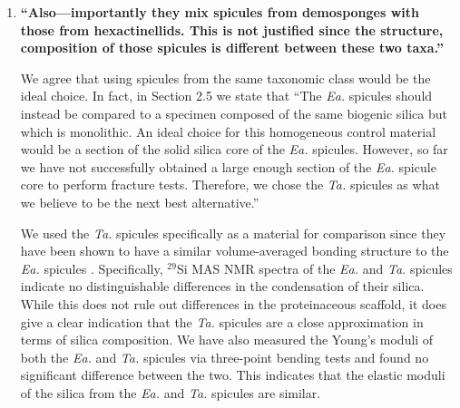 \documentclass[11pt,letterpaper]{report}
\makeatletter
\newcommand{\TA}{\textit{Ta.\@}\xspace}
\newcommand{\EA}{\textit{Ea.\@}\xspace}
\makeatother
\begin{document}
\begin{enumerate}[label=\textit{3.\arabic*},wide, labelwidth=!, labelindent=0pt]
To our knowledge Professor Weiner's group has not published any works on siliceous spicules (i.e. Demosponge or Hexactinellid spicules). Consequently, we have not included a review of their works in this manuscript. However, we do not deny the importance of the protein scaffold within the spicule's silica nor the composition of the interlayers. Our review of this topic focuses on the contributions of Dr. Weaver and Professor Aizenberg which are listed as references 17, 18, 43, and 54 in the revised version of the manuscript. These works describe the composition and nanoscale structure of the spicules' silica. We revisit the importance of the protein scaffold and composition of the silica itself in the final paragraph of Section 2.5. In this paragraph we point out that we chose the \TA spicules as a homogeneous control material based on the similarity of their composition and the composition of the \EA spicules. We admit that the best choice for this homogeneous control material would be the core of the \EA spicules themselves. However, we point out the difficulty of obtaining core samples large enough to test.

\item \label{r3c2} {\bf ``Also---importantly they mix spicules from demosponges with those from hexactinellids. This is not justified since the structure, composition of those spicules is different between these two taxa.''}

We agree that using spicules from the same taxonomic class would be the ideal choice. In fact, in Section 2.5 we state that ``The \EA spicules should instead be compared to a specimen composed of the same biogenic silica but which is monolithic. An ideal choice for this homogeneous control material would be a section of the solid silica core of the \EA spicules. However, so far we have not successfully obtained a large enough section of the \EA spicule core to perform fracture tests. Therefore, we chose the \TA spicules as what we believe to be the next best alternative.''

We used the \TA spicules specifically as a material for comparison since they have been shown to have a similar volume-averaged bonding structure to the \EA spicules \cite{weaver2010unifying}. Specifically, $^\text{29}$Si MAS NMR spectra of the \EA and \TA spicules indicate no distinguishable differences in the condensation of their silica. While this does not rule out differences in the proteinaceous scaffold, it does give a clear indication that the \TA spicules are a close approximation in terms of silica composition. We have also measured the Young's moduli of both the \EA and \TA spicules via three-point bending tests and found no significant difference between the two. This indicates that the elastic moduli of the silica from the \EA and \TA spicules are similar.


\end{enumerate}
\end{document}
